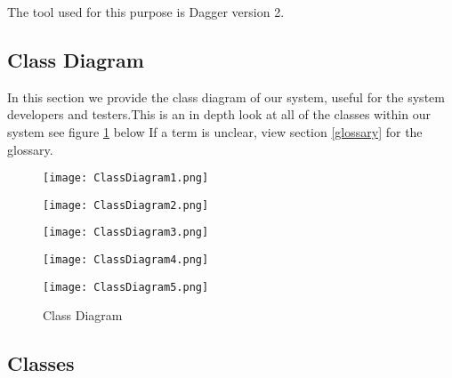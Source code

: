 \documentclass[12pt]{article}
\begin{document}
The tool used for this purpose is Dagger version 2.

\subsection{Class Diagram}

In this section we provide the class diagram of our system, useful for the system developers and testers.This is an in depth look at all of the classes within our system see figure \ref{fig:class-diagram} below If a term is unclear, view section \ref{glossary} for the glossary.

\begin{figure}[H]
\texttt{[image: ClassDiagram1.png]}
\end{figure}

\begin{figure}[H]
\texttt{[image: ClassDiagram2.png]}
\end{figure}

\begin{figure}[H]
\texttt{[image: ClassDiagram3.png]}
\end{figure}

\begin{figure}[H]
\texttt{[image: ClassDiagram4.png]}
\end{figure}

\begin{figure}[H]
\texttt{[image: ClassDiagram5.png]}
\caption{Class Diagram}
\label{fig:class-diagram}
\end{figure}

\clearpage

\subsection{Classes}


\end{document}
